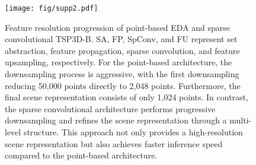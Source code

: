 \begin{figure}[h]
	\centering
	\texttt{[image: fig/supp2.pdf]}
    \caption{Feature resolution progression of point-based EDA and sparse convolutional TSP3D-B. \textcolor[rgb]{0.2, 0.457, 0.711}{SA}, \textcolor[rgb]{0.328, 0.508, 0.207}{FP}, \textcolor[rgb]{0.2, 0.457, 0.711}{SpConv}, and \textcolor[rgb]{0.328, 0.508, 0.207}{FU} represent set abstraction, feature propagation, sparse convolution, and feature upsampling, respectively. For the point-based architecture, the downsampling process is aggressive, with the first downsampling reducing 50,000 points directly to 2,048 points. Furthermore, the final scene representation consists of only 1,024 points. In contrast, the sparse convolutional architecture performs progressive downsampling and refines the scene representation through a multi-level structure. This approach not only provides a high-resolution scene representation but also achieves faster inference speed compared to the point-based architecture.}
	\label{fig:supp2}
\end{figure}



\begin{table*}[h]
\centering
\caption{Detailed comparison of computational cost for different single-stage architectures on the ScanRefer dataset~\citep{chen2020scanrefer}. The numbers in the table represent frames per second (FPS). TSP3D demonstrates superior processing speed across all components compared to other methods, with the inference speed of the sparse convolution backbone being three times faster than that of the point-based backbone.}
\label{tab:detal_speed}
{}
\end{table*}

